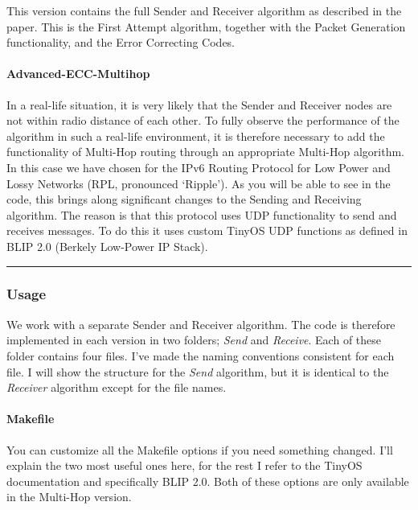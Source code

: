 This version contains the full Sender and Receiver algorithm as
described in the paper. This is the First Attempt algorithm, together
with the Packet Generation functionality, and the Error Correcting
Codes.

\paragraph{Advanced-ECC-Multihop}\label{advanced-ecc-multihop}

In a real-life situation, it is very likely that the Sender and Receiver
nodes are not within radio distance of each other. To fully observe the
performance of the algorithm in such a real-life environment, it is
therefore necessary to add the functionality of Multi-Hop routing
through an appropriate Multi-Hop algorithm. In this case we have chosen
for the IPv6 Routing Protocol for Low Power and Lossy Networks (RPL,
pronounced `Ripple'). As you will be able to see in the code, this
brings along significant changes to the Sending and Receiving algorithm.
The reason is that this protocol uses UDP functionality to send and
receives messages. To do this it uses custom TinyOS UDP functions as
defined in BLIP 2.0 (Berkely Low-Power IP Stack).

\begin{center}\rule{3in}{0.4pt}\end{center}

\subsubsection{Usage}\label{usage}

We work with a separate Sender and Receiver algorithm. The code is
therefore implemented in each version in two folders; \emph{Send} and
\emph{Receive}. Each of these folder contains four files. I've made the
naming conventions consistent for each file. I will show the structure
for the \emph{Send} algorithm, but it is identical to the
\emph{Receiver} algorithm except for the file names.

\paragraph{Makefile}\label{makefile}

You can customize all the Makefile options if you need something
changed. I'll explain the two most useful ones here, for the rest I
refer to the TinyOS documentation and specifically BLIP 2.0. Both of
these options are only available in the Multi-Hop version.

